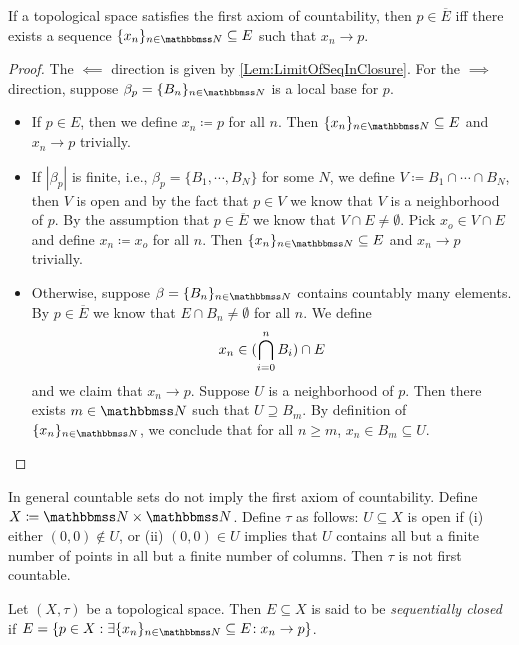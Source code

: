 \documentclass[screen,single]{techreport}
\numberwithin{equation}{section}
\begin{document}
\begin{lemma}\label{Lem:FirstCountLimitOfSeqIffClosure}
	If a topological space satisfies the first axiom of countability, then $p \in \overline{E}$ iff there exists a sequence $\{x_n\}_{n \in \bbN} \subseteq E$ such that $x_n \rightarrow p$.
\end{lemma}
\begin{proof}
	The ${\impliedby}$ direction is given by \cref{Lem:LimitOfSeqInClosure}.
	For the ${\implies}$ direction, suppose $\beta_p = \{B_n\}_{n \in \bbN}$ is a local base for $p$.
	\begin{itemize}
		\item If $p \in E$, then we define $x_n \coloneqq p$ for all $n$.
		Then $\{x_n\}_{n \in \bbN} \subseteq E$ and $x_n \rightarrow p$ trivially.
		\item If $|\beta_p|$ is finite, i.e., $\beta_p = \{B_1,\cdots,B_N\}$ for some $N$, we define $V \coloneqq B_1 \cap \cdots \cap B_N$, then $V$ is open and by the fact that $p \in V$ we know that $V$ is a neighborhood of $p$.
			By the assumption that $p \in \overline{E}$ we know that $V \cap E \neq \emptyset$.
			Pick $x_o \in V \cap E$ and define $x_n \coloneqq x_o$ for all $n$.
			Then $\{x_n\}_{n \in \bbN} \subseteq E$ and $x_n \rightarrow p$ trivially.
		\item Otherwise, suppose $\beta=\{B_n\}_{n \in \bbN}$ contains countably many elements.
			By $p \in \overline{E}$ we know that $E \cap B_n \neq \emptyset$ for all $n$.
			We define
			\[
			x_n \in ({ \bigcap_{i=0}^n B_i }) \cap E
			\]
			and we claim that $x_n \rightarrow p$.
			Suppose $U$ is a neighborhood of $p$.
			Then there exists $m \in \bbN$ such that $U \supseteq B_m$.
			By definition of $\{x_n\}_{n \in \bbN}$, we conclude that for all $n \ge m$, $x_n \in B_m \subseteq U$.
	\end{itemize}
\end{proof}

\begin{example}\label{Exa:CountableNotImplyFstCountable}
	In general countable sets do not imply the first axiom of countability.
	Define $X \coloneqq \bbN \times \bbN$.
	Define $\tau$ as follows: $U \subseteq X$ is open if (i) either $(0,0) \not\in U$, or (ii) $(0,0) \in U$ implies that $U$ contains all but a finite number of points in all but a finite number of columns.
	Then $\tau$ is not first countable.
\end{example}

\begin{definition}\label{De:SequentiallyClosed}
	Let $(X,\tau)$ be a topological space.
	Then $E \subseteq X$ is said to be \emph{sequentially closed} if $E = \{ p \in X : \Exists{\{x_n\}_{n \in \bbN} \subseteq E } x_n \rightarrow p \}$.
\end{definition}
\end{document}

